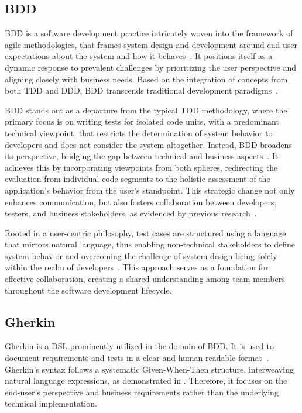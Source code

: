 \label{sec:background}
\subsection{\acl{BDD}}
\label{subsec:bdd}
\acf{BDD} is a software development practice intricately woven into the framework of agile methodologies, that frames system design and development around end user expectations about the system and how it behaves~\cite{BDD_2006}. It positions itself as a dynamic response to prevalent challenges by prioritizing the user perspective and aligning closely with business needs. Based on the integration of concepts from both \ac{TDD} and \ac{DDD}, \ac{BDD} transcends traditional development paradigms~\cite{BDD_2006}.

\ac{BDD} stands out as a departure from the typical \ac{TDD} methodology, where the primary focus is on writing tests for isolated code units, with a predominant technical viewpoint, that restricts the determination of system behavior to developers and does not consider the system altogether. Instead, \ac{BDD} broadens its perspective, bridging the gap between technical and business aspects~\cite{Farooq2023bdd,Binamungu2020bdd}. It achieves this by incorporating viewpoints from both spheres, redirecting the evaluation from individual code segments to the holistic assessment of the application's behavior from the user's standpoint. This strategic change not only enhances communication, but also fosters collaboration between developers, testers, and business stakeholders, as evidenced by previous research~\cite{smart2023bdd,pereira2018behavior}.

Rooted in a user-centric philosophy, test cases are structured using a language that mirrors natural language, thus enabling non-technical stakeholders to define system behavior and overcoming the challenge of system design being solely within the realm of developers~\cite{BDD_2006}. This approach serves as a foundation for effective collaboration, creating a shared understanding among team members throughout the software development lifecycle.

\subsection{Gherkin}
\label{subsec:gherkin}

Gherkin is a \acf{DSL} prominently utilized in the domain of \ac{BDD}. It is used to document requirements and tests in a clear and human-readable format~\cite{noauthor_gherkin_nodate}. Gherkin's syntax follows a systematic Given-When-Then structure, interweaving natural language expressions, as demonstrated in . Therefore, it focuses on the end-user's perspective and business requirements rather than the underlying technical implementation.


